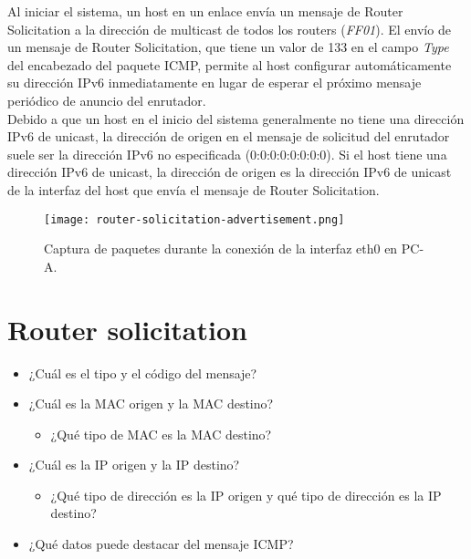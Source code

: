 \documentclass[osajnl,twocolumn,showpacs,superscriptaddress,10pt]{revtex4-1} %
\begin{document}
Al iniciar el sistema, un host en un enlace envía un mensaje de Router Solicitation a la dirección de multicast de todos 
los routers (\textit{FF01}). El envío de un mensaje de Router Solicitation, que tiene un valor de 133 en el 
campo \textit{Type} del encabezado del paquete ICMP, permite al host configurar automáticamente su dirección IPv6 
inmediatamente en lugar de esperar el próximo mensaje periódico de anuncio del enrutador. \\

Debido a que un host en el inicio del sistema generalmente no tiene una dirección IPv6 de unicast, la dirección de origen 
en el mensaje de solicitud del enrutador suele ser la dirección IPv6 no especificada (0:0:0:0:0:0:0:0). 
Si el host tiene una dirección IPv6 de unicast, la dirección de origen es la dirección IPv6 de unicast 
de la interfaz del host que envía el mensaje de Router Solicitation. \\

\begin{figure}[H]
    \centering
    \texttt{[image: router-solicitation-advertisement.png]}
    \caption{Captura de paquetes durante la conexión de la interfaz eth0 en PC-A.}
    \label{image:router-solicitation-advertisement}
\end{figure}

\section{Router solicitation}

\begin{itemize}
    \item ¿Cuál es el tipo y el código del mensaje?
    
    

    \item ¿Cuál es la MAC origen y la MAC destino?
    
    \begin{itemize}
        \item ¿Qué tipo de MAC es la MAC destino?
    \end{itemize}

    \item ¿Cuál es la IP origen y la IP destino?
    
    \begin{itemize}
        \item ¿Qué tipo de dirección es la IP origen y qué tipo de dirección es la IP destino?
    \end{itemize}

    \item ¿Qué datos puede destacar del mensaje ICMP?
\end{itemize}
\end{document}
